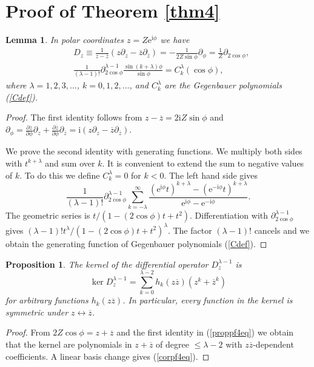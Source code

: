 \documentclass[oneside]{amsart}
\newcommand{\ee}{\mathrm{e}}
\newcommand{\ii}{\mathrm{i}}
\newcommand{\zz}{{\overline{z}}}
\theoremstyle{plain}
\newtheorem{lem}[thm]{Lemma}
\newtheorem{prop}[thm]{Proposition}
\begin{document}
\section{Proof of Theorem \ref{thm4}}\label{sectpf4}
\begin{lem}
In polar coordinates $z=Z\ee^{\ii\phi}$ we have
\begin{align}\label{proppf4eq}
&D_z\equiv\frac{1}{z-\zz}(z\partial_z-\zz\partial_\zz)=-\frac{1}{2Z\sin\phi}\partial_\phi=\frac{1}{Z}\partial_{2\!\cos\phi},\nonumber\\
&\frac{1}{(\lambda-1)!}\partial_{2\!\cos\phi}^{\lambda-1}\frac{\sin(k+\lambda)\phi}{\sin\phi}=C^\lambda_k(\cos\phi),
\end{align}
where $\lambda=1,2,3,\ldots$, $k=0,1,2,\ldots$, and $C^\lambda_k$ are the Gegenbauer polynomials (\ref{Cdef}).
\end{lem}
\begin{proof}
The first identity follows from $z-\zz=2\ii Z\sin\phi$ and
$\partial_\phi=\frac{\partial z}{\partial\phi}\partial_z+\frac{\partial\zz}{\partial\phi}\partial_\zz=\ii(z\partial_z-\zz\partial_\zz)$.

We prove the second identity with generating functions. We multiply both sides with $t^{k+\lambda}$ and sum over $k$. It is convenient to extend the sum to negative values
of $k$. To do this we define $C^\lambda_k=0$ for $k<0$. The left hand side gives
$$
\frac{1}{(\lambda-1)!}\partial_{2\!\cos\phi}^{\lambda-1}\sum_{k=-\lambda}^\infty\frac{(\ee^{\ii\phi}t)^{k+\lambda}-(\ee^{-\ii\phi}t)^{k+\lambda}}{\ee^{\ii\phi}-\ee^{-\ii\phi}}.
$$
The geometric series is $t/(1-(2\cos\phi)t+t^2)$. Differentiation with $\partial_{2\!\cos\phi}^{\lambda-1}$ gives $(\lambda-1)!t^\lambda/(1-(2\cos\phi)t+t^2)^\lambda$.
The factor $(\lambda-1)!$ cancels and we obtain the generating function of Gegenbauer polynomials (\ref{Cdef}).
\end{proof}

\begin{prop}\label{proppf4}
The kernel of the differential operator $D_z^{\lambda-1}$ is
\begin{equation}\label{corpf4eq}
\ker D_z^{\lambda-1}=\sum_{k=0}^{\lambda-2}h_k(z\zz)(z^k+\zz^k)
\end{equation}
for arbitrary functions $h_k(z\zz)$. In particular, every function in the kernel is symmetric under $z\leftrightarrow\zz$.
\end{prop}
\begin{proof}
From $2Z\cos\phi=z+\zz$ and the first identity in (\ref{proppf4eq}) we obtain that the kernel are polynomials in $z+\zz$ of degree $\leq\lambda-2$ with $z\zz$-dependent coefficients.
A linear basis change gives (\ref{corpf4eq}).
\end{proof}
\end{document}
